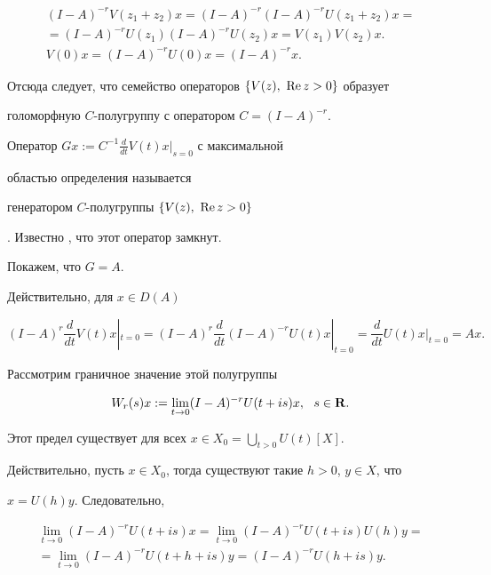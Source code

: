 \begin{pf}
\begin{gather*}
(I-A)^{-r}V(z_1+z_2)x=(I-A)^{-r}(I-A)^{-r}U(z_1+z_2)x= \\


%


=(I-A)^{-r}U(z_1)(I-A)^{-r}U(z_2)x=V(z_1)V(z_2)x. \\


%


V(0)x=(I-A)^{-r}U(0)x=(I-A)^{-r}x.


\end{gather*}


Отсюда следует, что семейство операторов $\{V(z),\ \operatorname{Re} z>0\}$ образует


голоморфную $C$-полугруппу с оператором $C=(I-A)^{-r}$.


Оператор $Gx:=C^{-1}\frac{d}{dt}V(t)x|_{s=0}$ с максимальной


областью определения называется 


генератором $C$-полугруппы $\{V(z),\ \operatorname{Re} z>0\}$


\cite{Boyadzhiev}. Известно \cite{Tanaka1}, что этот оператор замкнут.


Покажем, что $G=A$.


Действительно, для $x\in D(A)$


$$


(I-A)^r\frac{d}{dt}V(t)x|_{t=0}=


(I-A)^r\frac{d}{dt}(I-A)^{-r}U(t)x|_{t=0}=


\frac{d}{dt}U(t)x|_{t=0}=Ax.


$$


Рассмотрим граничное значение этой полугруппы


\begin{equation}\label{10}


W_r(s)x:=\lim\limits_{t\to 0}(I-A)^{-r}U(t+is)x,\ \ s\in \bold R.


\end{equation}


Этот предел существует для всех $x \in X_0=\bigcup\limits_{t > 0}U(t)[X]$.


Действительно, пусть $x \in X_0$, тогда существуют такие $h>0$, $y\in X$, что


$x=U(h)y$. Следовательно, 


\begin{multline*}


\lim_{t\to 0}(I-A)^{-r}U(t+is)x=\lim_{t\to 0}(I-A)^{-r}U(t+is)U(h)y=\\


%


=\lim_{t\to 0}(I-A)^{-r}U(t+h+is)y=(I-A)^{-r}U(h+is)y.



\end{multline*}
\end{pf}

